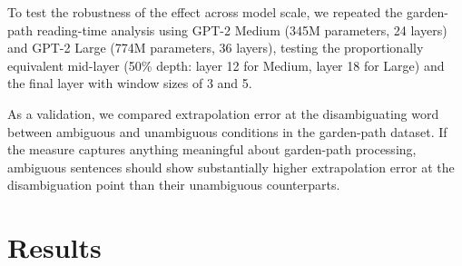 \documentclass[12pt]{article}
\begin{document}
To test the robustness of the effect across model scale, we repeated the garden-path reading-time analysis using GPT-2 Medium (345M parameters, 24 layers) and GPT-2 Large (774M parameters, 36 layers), testing the proportionally equivalent mid-layer (50\% depth: layer 12 for Medium, layer 18 for Large) and the final layer with window sizes of 3 and 5.

As a validation, we compared extrapolation error at the disambiguating word between ambiguous and unambiguous conditions in the garden-path dataset. If the measure captures anything meaningful about garden-path processing, ambiguous sentences should show substantially higher extrapolation error at the disambiguation point than their unambiguous counterparts.

\section{Results}
\end{document}
